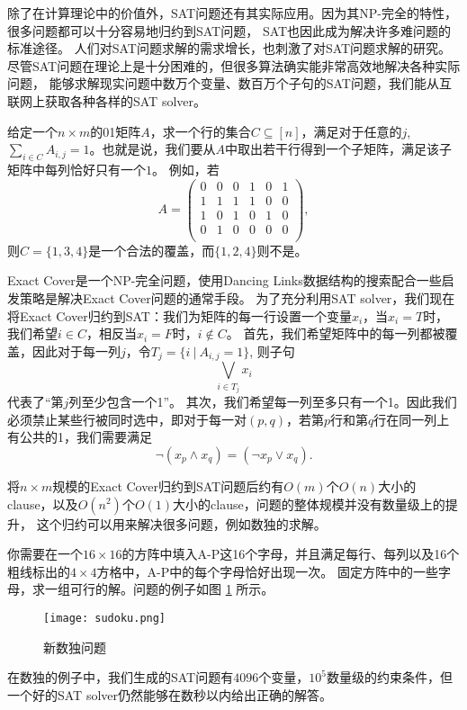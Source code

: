 除了在计算理论中的价值外，SAT问题还有其实际应用。因为其NP-完全的特性，很多问题都可以十分容易地归约到SAT问题，
SAT也因此成为解决许多难问题的标准途径。
人们对SAT问题求解的需求增长，也刺激了对SAT问题求解的研究。尽管SAT问题在理论上是十分困难的，但很多算法确实能非常高效地解决各种实际问题，
能够求解现实问题中数万个变量、数百万个子句的SAT问题，我们能从互联网上获取各种各样的SAT solver。

\begin{prob}
 给定一个$n\times m$的01矩阵$A$，求一个行的集合$C\subseteq[n]$，满足对于任意的$j$, 
 $\sum_{i\in C} A_{i,j} = 1$。也就是说，我们要从$A$中取出若干行得到一个子矩阵，满足该子矩阵中每列恰好只有一个$1$。
 例如，若
 $$A = 
 \begin{pmatrix}
  0 & 0 & 0 & 1 & 0 & 1\\
  1 & 1 & 1 & 1 & 0 & 0\\
  1 & 0 & 1 & 0 & 1 & 0\\
  0 & 1 & 0 & 0 & 0 & 0\\
 \end{pmatrix},
 $$
 则$C=\{1, 3, 4\}$是一个合法的覆盖，而$\{1, 2, 4\}$则不是。
\end{prob}


Exact Cover是一个NP-完全问题，使用Dancing Links数据结构的搜索配合一些启发策略是解决Exact Cover问题的通常手段。
为了充分利用SAT solver，我们现在将Exact Cover归约到SAT：我们为矩阵的每一行设置一个变量$x_i$，当$x_i=T$时，我们希望$i\in C$，相反当$x_i=F$时，$i\notin C$。
首先，我们希望矩阵中的每一列都被覆盖，因此对于每一列$j$，令$T_j = \{ i~|~ A_{i,j} = 1\}$, 则子句
$$\bigvee_{i \in T_j} x_i$$
代表了``第$j$列至少包含一个1''。
其次，我们希望每一列至多只有一个1。因此我们必须禁止某些行被同时选中，即对于每一对$(p,q)$，若第$p$行和第$q$行在同一列上有公共的1，我们需要满足
$$\neg (x_p \land x_q) = (\neg x_p \lor x_q).$$

将$n\times m$规模的Exact Cover归约到SAT问题后约有$O(m)$个$O(n)$大小的clause，以及$O(n^2)$个$O(1)$大小的clause，问题的整体规模并没有数量级上的提升，
这个归约可以用来解决很多问题，例如数独的求解。

\begin{prob}[新数独问题]
 你需要在一个$16\times16$的方阵中填入A-P这16个字母，并且满足每行、每列以及16个粗线标出的$4\times4$方格中，A-P中的每个字母恰好出现一次。
 固定方阵中的一些字母，求一组可行的解。问题的例子如图 \ref{fig:SUDOKU} 所示。
 \begin{figure}
  \center
  \texttt{[image: sudoku.png]}
  \caption{新数独问题}
  \label{fig:SUDOKU}
 \end{figure}
\end{prob}

在数独的例子中，我们生成的SAT问题有$4096$个变量，$10^5$数量级的约束条件，但一个好的SAT solver仍然能够在数秒以内给出正确的解答。